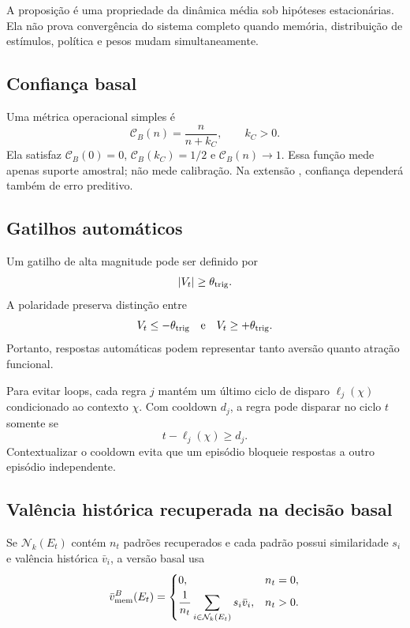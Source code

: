 \begin{remark}
A proposição é uma propriedade da dinâmica média sob hipóteses estacionárias. Ela não prova convergência do sistema completo quando memória, distribuição de estímulos, política e pesos mudam simultaneamente.
\end{remark}

\subsection{Confiança basal}

Uma métrica operacional simples é
\begin{equation}
\mathcal C_B(n)=\frac{n}{n+k_C},
\qquad k_C>0.
\label{eq:confidence_base}
\end{equation}
Ela satisfaz \(\mathcal C_B(0)=0\), \(\mathcal C_B(k_C)=1/2\) e \(\mathcal C_B(n)\to1\). Essa função mede apenas suporte amostral; não mede calibração. Na extensão \EVPM, confiança dependerá também de erro preditivo.

\subsection{Gatilhos automáticos}

Um gatilho de alta magnitude pode ser definido por
\begin{equation}
\left\lvert V_t \right\rvert\ge\theta_{\rm trig}.
\label{eq:trigger_abs}
\end{equation}
A polaridade preserva distinção entre
\[
V_t\le-\theta_{\rm trig}
\quad\text{e}\quad
V_t\ge+\theta_{\rm trig}.
\]
Portanto, respostas automáticas podem representar tanto aversão quanto atração funcional.

Para evitar loops, cada regra \(j\) mantém um último ciclo de disparo \(\ell_j(\chi)\) condicionado ao contexto \(\chi\). Com cooldown \(d_j\), a regra pode disparar no ciclo \(t\) somente se
\begin{equation}
t-\ell_j(\chi)\ge d_j.
\end{equation}
Contextualizar o cooldown evita que um episódio bloqueie respostas a outro episódio independente.

\subsection{Valência histórica recuperada na decisão basal}

Se \(\mathcal N_k(E_t)\) contém \(n_t\) padrões recuperados e cada padrão possui similaridade \(s_i\) e valência histórica \(\bar v_i\), a versão basal usa
\begin{equation}
\bar v_{\rm mem}^{B}(E_t)=
\begin{cases}
0, & n_t=0,\\[1mm]
\dfrac1{n_t}\displaystyle\sum_{i\in\mathcal N_k(E_t)}s_i\bar v_i, & n_t>0.
\end{cases}
\label{eq:vmem_base}
\end{equation}

